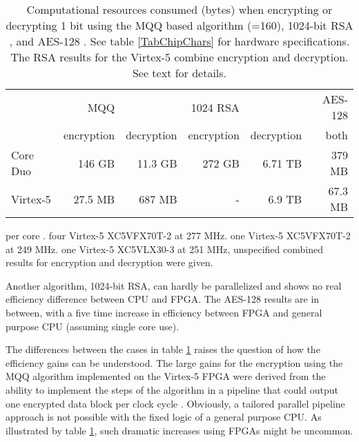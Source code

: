 \documentclass{article}
\begin{document}
\begin{comment}
Core Duo:
MQQ enc: 7.57*10^(17)/(5.19*10^6)
MQQ dec: 7.57*10^(17)/(67.0*10^6)
RSA enc: 7.57*10^(17)/(2*1.39*10^6)
RSA dec: 7.57*10^(17)/(2*56.4*10^3)
AES enc: 7.57*10^(17)/(2*1*10^9)
Virtex:
MQQ enc: 4*3.04*10^(17)/(44.27*10^9)
MQQ dec: 2.74*10^(17)/(399.04*10^6)
RSA enc: 2.76*10^(17)/(40*10^3)
RSA dec: 
AES enc: 2.76*10^(17)/(4.1*10^9)
\end{comment}

\begin{table}[b]
\caption{Computational resources consumed (bytes) when encrypting or decrypting 1 
bit using the MQQ based algorithm (=160)\cite{Gligoroski0808.0247}, 1024-bit RSA
\cite{Gligoroski0808.0247}, and AES-128 \cite{JemMatzan2006,bulens2008implementation}. 
See table \ref{TabChipChars} for hardware specifications. The RSA results 
for the Virtex-5 combine encryption and decryption. See text for details.}
\begin{tabular}{lrrrrr}
                 & MQQ        &            &1024 RSA & &AES-128\\
                 & encryption & decryption &encryption & decryption & both\\
\hline
Core Duo & 146 GB& 11.3 GB & 272 GB & 6.71 TB & 379 MB\\
Virtex-5 & 27.5 MB  & 687 MB & - & 6.9 TB & 67.3 MB\\
\end{tabular} \newline
{\footnotesize  per core \cite{PersonalGligoroski}.  four Virtex-5 XC5VFX70T-2 at 277 MHz.
 one Virtex-5 XC5VFX70T-2 at 249 MHz.  one Virtex-5 XC5VLX30-3 at 251 MHz, unspecified combined 
results for encryption and decryption were given.}
\label{TabCompRes}
\end{table}

Another algorithm, 1024-bit RSA, can hardly be parallelized and shows no real efficiency difference 
between CPU and FPGA. The AES-128 results are in between,
with a five time increase in efficiency between FPGA and general purpose CPU (assuming single core use).

The differences between the cases in table \ref{TabCompRes} raises the question of how the efficiency
gains can be understood. The large gains for the encryption using the MQQ algorithm implemented on
the Virtex-5 FPGA were derived from the ability to implement the steps of the algorithm in a pipeline that
could output one encrypted data block per clock cycle \cite{PersonalGligoroski}. Obviously, a 
tailored parallel pipeline approach is not possible with the fixed logic of a general purpose CPU. 
As illustrated by table \ref{TabCompRes}, such dramatic increases using FPGAs might be uncommon.
\end{document}
